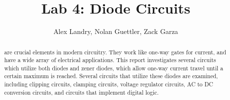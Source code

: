 \documentclass[twocolumn,english]{IEEEtran}
\begin{document}
\title{Lab 4: Diode Circuits}
\author{Alex Landry, Nolan Guettler, Zack Garza} %

\maketitle

\begin{abstract}
 are crucial elements in modern circuitry. They work like one-way gates for current, and have a wide array of electrical applications. This report investigates several circuits which utilize both diodes and zener diodes,  which allow one-way current travel until a certain maximum is reached. Several circuits that utilize these diodes are examined, including clipping circuits, clamping circuits, voltage regulator circuits, AC to DC conversion circuits, and circuits that implement digital logic.
\end{abstract}

\tableofcontents
\end{document}
